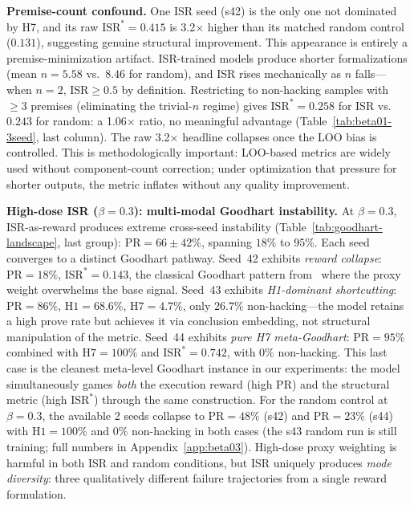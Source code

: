 \textbf{Premise-count confound.}
One ISR seed (s42) is the only one not dominated by H7, and its raw $\text{ISR}^*{=}0.415$ is 3.2$\times$ higher than its matched random control ($0.131$), suggesting genuine structural improvement.
This appearance is entirely a premise-minimization artifact.
ISR-trained models produce shorter formalizations (mean $n{=}5.58$ vs.\ $8.46$ for random), and ISR rises mechanically as $n$ falls---when $n{=}2$, ISR$\geq 0.5$ by definition.
Restricting to non-hacking samples with $\geq{3}$ premises (eliminating the trivial-$n$ regime) gives $\text{ISR}^*{=}0.258$ for ISR vs.\ $0.243$ for random: a 1.06$\times$ ratio, no meaningful advantage (Table~\ref{tab:beta01-3seed}, last column). %
The raw 3.2$\times$ headline collapses once the LOO bias is controlled.
This is methodologically important: LOO-based metrics are widely used without component-count correction; under optimization that pressure for shorter outputs, the metric inflates without any quality improvement.

\textbf{High-dose ISR ($\beta{=}0.3$): multi-modal Goodhart instability.}
At $\beta{=}0.3$, ISR-as-reward produces extreme cross-seed instability (Table~\ref{tab:goodhart-landscape}, last group): $\text{PR}{=}66{\pm}42\%$, spanning $18\%$ to $95\%$.
Each seed converges to a distinct Goodhart pathway. %
Seed~42 exhibits \emph{reward collapse}: $\text{PR}{=}18\%$, $\text{ISR}^{*}{=}0.143$, the classical Goodhart pattern from~\citep{gao-reward-overoptimization} where the proxy weight overwhelms the base signal.
Seed~43 exhibits \emph{H1-dominant shortcutting}: $\text{PR}{=}86\%$, $\text{H1}{=}68.6\%$, $\text{H7}{=}4.7\%$, only $26.7\%$ non-hacking---the model retains a high prove rate but achieves it via conclusion embedding, not structural manipulation of the metric.
Seed~44 exhibits \emph{pure H7 meta-Goodhart}: $\text{PR}{=}95\%$ combined with $\text{H7}{=}100\%$ and $\text{ISR}^{*}{=}0.742$, with $0\%$ non-hacking.
This last case is the cleanest meta-level Goodhart instance in our experiments: the model simultaneously games \emph{both} the execution reward (high PR) and the structural metric (high $\text{ISR}^{*}$) through the same construction.
For the random control at $\beta{=}0.3$, the available 2 seeds collapse to $\text{PR}{=}48\%$ (s42) and $\text{PR}{=}23\%$ (s44) with $\text{H1}{=}100\%$ and $0\%$ non-hacking in both cases (the s43 random run is still training; full numbers in Appendix~\ref{app:beta03}). %
High-dose proxy weighting is harmful in both ISR and random conditions, but ISR uniquely produces \emph{mode diversity}: three qualitatively different failure trajectories from a single reward formulation.

